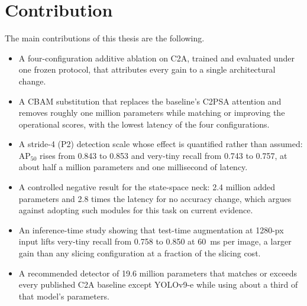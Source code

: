 \section{Contribution}
The main contributions of this thesis are the following.
\begin{itemize}
  \item A four-configuration additive ablation on C2A, trained and evaluated
        under one frozen protocol, that attributes every gain to a single
        architectural change.
  \item A CBAM substitution that replaces the baseline's C2PSA attention and
        removes roughly one million parameters while matching or improving
        the operational scores, with the lowest latency of the four
        configurations.
  \item A stride-4 (P2) detection scale whose effect is quantified rather
        than assumed: $\mathrm{AP}_{50}$ rises from 0.843 to 0.853 and
        very-tiny recall from 0.743 to 0.757, at about half a million
        parameters and one millisecond of latency.
  \item A controlled negative result for the state-space neck: 2.4 million
        added parameters and 2.8 times the latency for no accuracy change,
        which argues against adopting such modules for this task on current
        evidence.
  \item An inference-time study showing that test-time augmentation at
        1280-px input lifts very-tiny recall from 0.758 to 0.850 at 60~ms per
        image, a larger gain than any slicing configuration at a fraction of
        the slicing cost.
  \item A recommended detector of 19.6 million parameters that matches or
        exceeds every published C2A baseline except YOLOv9-e while using
        about a third of that model's parameters.
\end{itemize}

